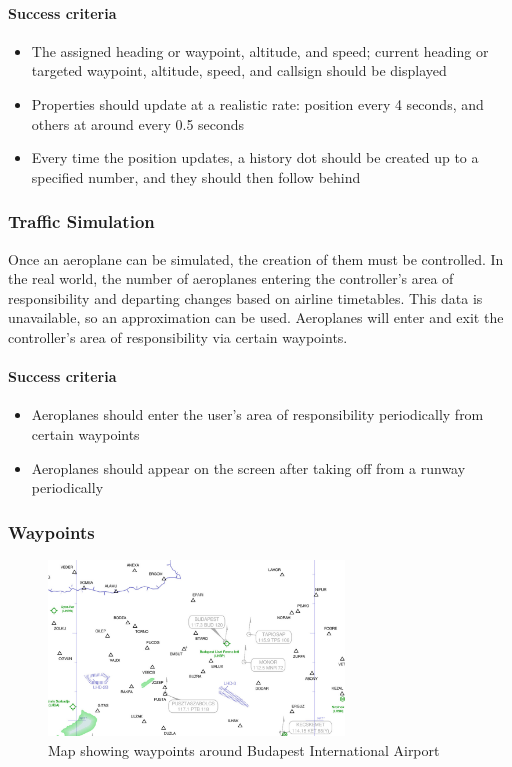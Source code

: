 \documentclass{article}
\begin{document}
\paragraph{Success criteria}
\begin{itemize}
    \item The assigned heading or waypoint, altitude, and speed; current heading or targeted waypoint, altitude, speed, and callsign should be displayed
    \item Properties should update at a realistic rate: position every 4 seconds, and others at around every 0.5 seconds
    \item Every time the position updates, a history dot should be created up to a specified number, and they should then follow behind
\end{itemize}

\subsubsection{Traffic Simulation}
Once an aeroplane can be simulated, the creation of them must be controlled.
In the real world, the number of aeroplanes entering the controller's area of responsibility and departing changes based on airline timetables.
This data is unavailable, so an approximation can be used.
Aeroplanes will enter and exit the controller's area of responsibility via certain waypoints.

\paragraph{Success criteria}
\begin{itemize}
    \item Aeroplanes should enter the user's area of responsibility periodically from certain waypoints
    \item Aeroplanes should appear on the screen after taking off from a runway periodically
\end{itemize}

\subsubsection{Waypoints}
\begin{figure}[H]
\centering
\includegraphics[width=0.7\textwidth]{context/budapest.png}
\caption{\label{fig:budapest}Map showing waypoints around Budapest International Airport}
\end{figure}
\end{document}
